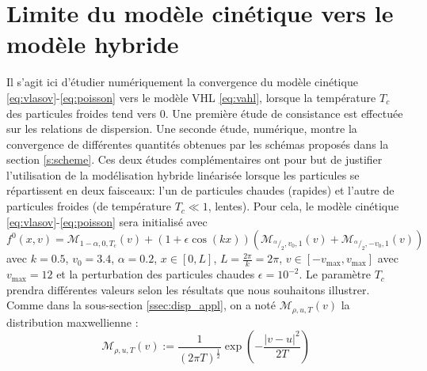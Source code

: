 
\section{Limite du modèle cinétique vers le modèle hybride}
 \label{s:limit}

Il s'agit ici d'étudier numériquement la convergence du modèle cinétique \eqref{eq:vlasov}-\eqref{eq:poisson} vers le modèle VHL \eqref{eq:vahl}, lorsque la température $T_c$ des particules froides tend vers 0. Une première étude de consistance est effectuée sur les relations de dispersion. Une seconde étude, numérique, montre la convergence de différentes quantités obtenues par les schémas proposés dans la section \ref{s:scheme}. Ces deux études complémentaires ont pour but de justifier l'utilisation de la modélisation hybride linéarisée lorsque les particules se répartissent en deux faisceaux: l'un de particules chaudes (rapides) et l'autre de particules froides (de température $T_c\ll 1$, lentes). Pour cela, le modèle cinétique \eqref{eq:vlasov}-\eqref{eq:poisson} sera initialisé avec
\begin{equation}
  f^0(x,v) = \mathcal{M}_{1-\alpha,0,T_c}(v) + (1+\epsilon\cos(kx))\left( \mathcal{M}_{^\alpha/_2,v_0,1}(v) + \mathcal{M}_{^\alpha/_2,-v_0,1}(v) \right)
\label{eq:K:init}
\end{equation}
avec $k = 0.5$, $v_0 = 3.4$, $\alpha=0.2$, $x\in[0,L]$, $L=\frac{2\pi}{k}=2\pi$, $v\in[-v_{\text{max}},v_{\text{max}}]$ avec $v_{\text{max}}=12$ et la perturbation des particules chaudes $\epsilon = 10^{-2}$. Le paramètre $T_c$ prendra différentes valeurs selon les résultats que nous souhaitons illustrer. Comme dans la sous-section \ref{ssec:disp_appl}, on a noté  $\mathcal{M}_{\rho,u,T}(v)$ la distribution maxwellienne :
$$
  \mathcal{M}_{\rho,u,T}(v) := \frac{1}{(2\pi T)^{\frac{1}{2}}}\exp\left(-\frac{\left|v-u\right|^2}{2T}\right)
$$

